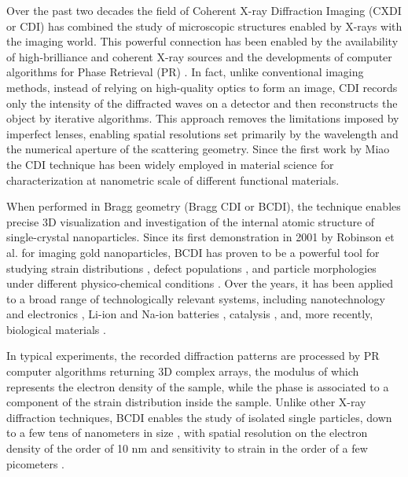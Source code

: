 Over the past two decades the field of Coherent X-ray Diffraction Imaging (CXDI or CDI) has combined the study of microscopic structures 
enabled by X-rays with the imaging world. This powerful connection has been enabled by the availability of high-brilliance and 
coherent X-ray sources and the developments of computer algorithms for Phase Retrieval (PR) \cite{fienup_reconstruction_1978, fienup_phase_1982,Luke_2004}. 
In fact, unlike conventional imaging methods, 
instead of relying on high-quality optics to form an image, CDI records only the intensity of the diffracted waves on 
a detector and then reconstructs the object by iterative algorithms. 
This approach removes the limitations imposed by imperfect lenses, enabling spatial resolutions set primarily by the 
wavelength and the numerical aperture of the scattering geometry. 
Since the first work by Miao \cite{Miao1998} the CDI technique has been widely employed in material science for 
characterization at nanometric scale of different functional materials. \cite{Neutze2000, Chapman2005, Schroer2008, Rodriguez2015}

When performed in Bragg geometry (Bragg CDI or BCDI), the technique enables precise 3D visualization and investigation 
of the internal atomic structure of single-crystal nanoparticles. Since its first demonstration in 2001 by Robinson 
et al. \cite{Robinson_gold_2001} for imaging gold nanoparticles, BCDI has proven to be a powerful tool for studying 
strain distributions \cite{pfeifer2006three, Robinson2009, Newton2010}, defect populations \cite{Favre-Nicolin_2010, Labat2015, Dupraz2017}, 
and particle morphologies under different physico-chemical conditions \cite{Carnis2021, FacetStrain2022, Chatelier2024, 
Grimes2024}. Over the years, it has been applied to a broad range of technologically relevant systems, including 
nanotechnology and electronics \cite{Favre-Nicolin_2010}, Li-ion and Na-ion batteries \cite{Singer2018, Serban2024}, 
catalysis \cite{atlan_imaging_2023}, and, more recently, biological materials \cite{Grunewald:ro5042}.

In typical experiments, the recorded diffraction patterns are processed by PR computer algorithms returning 
3D complex arrays, the modulus of which represents the electron density of the sample, while the phase is associated to
a component of the strain distribution inside the sample.  
Unlike other X-ray diffraction techniques, BCDI enables the study of isolated single particles, down to a few tens of 
nanometers in size \cite{MAXIV60nm, MIR20nm}, with spatial resolution on the electron density of the order of 10 nm \cite{cherukara_anisotropic_2018} 
and sensitivity to strain in the order of a few picometers \cite{Labat2015}.

